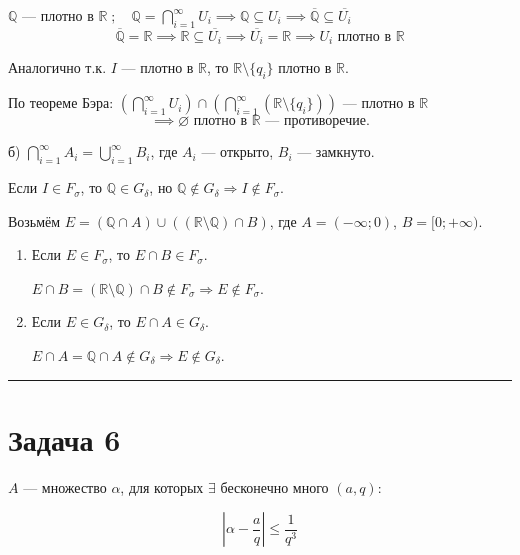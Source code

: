 \documentclass[12pt, a4paper]{article}
\begin{document}
\noindent $\mathbb{Q}$ --- плотно в $\mathbb{R} \; ; \quad \mathbb{Q} = \bigcap\limits_{i=1}^\infty U_i \implies \mathbb{Q} \subseteq U_i \implies \overline{\mathbb{Q}} \subseteq \overline{U_i}$
\[
\overline{\mathbb{Q}} = \mathbb{R} \implies \mathbb{R} \subseteq \overline{U_i} \implies \overline{U_i} = \mathbb{R} \implies U_i \text{ плотно в } \mathbb{R}
\]

\noindent Аналогично т.к. $I$ --- плотно в $\mathbb{R}$, то $\mathbb{R} \setminus \{q_i\}$ плотно в $\mathbb{R}$.

\bigskip

\noindent По теореме Бэра: $\left(\bigcap\limits_{i=1}^\infty U_i\right) \cap \left(\bigcap\limits_{i=1}^\infty (\mathbb{R} \setminus \{q_i\})\right)$ --- плотно в $\mathbb{R}$
\[
\implies \varnothing \text{ плотно в } \mathbb{R} \text{ --- противоречие.}
\]

\bigskip

\noindent б) $\displaystyle\bigcap_{i=1}^{\infty} A_i = \bigcup_{i=1}^{\infty} B_i$, где $A_i$ --- открыто, $B_i$ --- замкнуто.
    
Если $I \in F_\sigma$, то $\mathbb{Q} \in G_\delta$, но $\mathbb{Q} \notin G_\delta \Rightarrow I \notin F_\sigma$.

Возьмём $E = (\mathbb{Q} \cap A) \cup ((\mathbb{R} \setminus \mathbb{Q}) \cap B)$, где $A = (-\infty; 0)$, $B = [0; +\infty)$.

\begin{enumerate}
    \item[1)] Если $E \in F_\sigma$, то $E \cap B \in F_\sigma$.
    
    $E \cap B = (\mathbb{R} \setminus \mathbb{Q}) \cap B \notin F_\sigma \Rightarrow E \notin F_\sigma$.
    
    \item[2)] Если $E \in G_\delta$, то $E \cap A \in G_\delta$.
    
    $E \cap A = \mathbb{Q} \cap A \notin G_\delta \Rightarrow E \notin G_\delta$.
\end{enumerate}

\bigskip
\hrule
\bigskip

\section*{Задача 6}

$A$ --- множество $\alpha$, для которых $\exists$ бесконечно много $(a, q)$:

\[
\left| \alpha - \frac{a}{q} \right| \le \frac{1}{q^3}
\]
\end{document}
